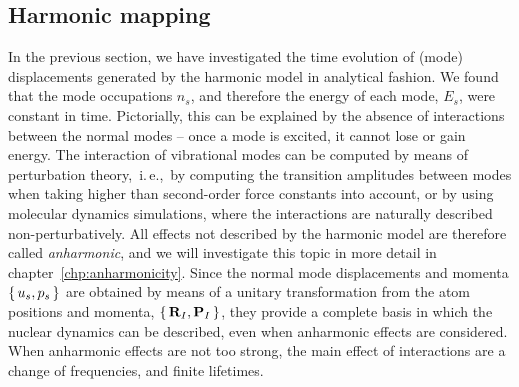 


\subsection{Harmonic mapping}
In the previous section, we have investigated the time evolution of (mode) displacements generated by the harmonic model in analytical fashion. We found that the mode occupations $n_s$, and therefore the energy of each mode, $E_s$, were constant in time. Pictorially, this can be explained by the absence of interactions between the normal modes -- once a mode is excited, it cannot lose or gain energy.
The interaction of vibrational modes can be computed by means of perturbation theory,~i.\,e.,~by computing the transition amplitudes between modes when taking higher than second-order force constants into account, or by using molecular dynamics simulations, where the interactions are naturally described non-perturbatively. All effects not described by the harmonic model are therefore called \emph{anharmonic}, and we will investigate this topic in more detail in chapter~\ref{chp:anharmonicity}. 
Since the normal mode displacements and momenta $\set{u_s, p_s}$ are obtained by means of a unitary transformation from the atom positions and momenta, $\set{{\bf R}_I, {\bf P}_I}$, they provide a complete basis in which the nuclear dynamics can be described, even when anharmonic effects are considered. When anharmonic effects are not too strong, the main effect of interactions are a change of frequencies, and finite lifetimes.

